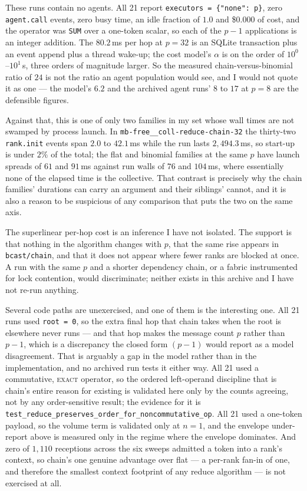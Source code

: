 \documentclass[11pt]{article}
\begin{document}
These runs contain no agents. All 21 report \texttt{executors = \{"none": p\}}, zero
\texttt{agent.call} events, zero busy time, an idle fraction of $1.0$ and \$0.000 of cost, and
the operator was \texttt{SUM} over a one-token scalar, so each of the $p-1$ applications is an
integer addition. The $80.2$\,ms per hop at $p=32$ is an SQLite transaction plus an event append
plus a thread wake-up; the cost model's $\alpha$ is on the order of $10^0$--$10^1$\,s, three
orders of magnitude larger. So the measured chain-versus-binomial ratio of $24$ is not the ratio
an agent population would see, and I would not quote it as one --- the model's $6.2$ and the
archived agent runs' $8$ to $17$ at $p=8$ are the defensible figures.

Against that, this is one of only two families in my set whose wall times are not swamped by
process launch. In \texttt{mb-free\_\_coll-reduce-chain-32} the thirty-two \texttt{rank.init}
events span $2.0$ to $42.1$\,ms while the run lasts $2{,}494.3$\,ms, so start-up is under $2\%$
of the total; the flat and binomial families at the same $p$ have launch spreads of $61$ and
$91$\,ms against run walls of $76$ and $104$\,ms, where essentially none of the elapsed time is
the collective. That contrast is precisely why the chain families' durations can carry an
argument and their siblings' cannot, and it is also a reason to be suspicious of any comparison
that puts the two on the same axis.

The superlinear per-hop cost is an inference I have not isolated. The support is that nothing in
the algorithm changes with $p$, that the same rise appears in \texttt{bcast/chain}, and that it
does not appear where fewer ranks are blocked at once. A run with the same $p$ and a shorter
dependency chain, or a fabric instrumented for lock contention, would discriminate; neither
exists in this archive and I have not re-run anything.

Several code paths are unexercised, and one of them is the interesting one. All 21 runs used
\texttt{root = 0}, so the extra final hop that chain takes when the root is elsewhere never
runs --- and that hop makes the message count $p$ rather than $p-1$, which is a discrepancy the
closed form $(p-1)$ would report as a model disagreement. That is arguably a gap in the model
rather than in the implementation, and no archived run tests it either way. All 21 used a
commutative, \textsc{exact} operator, so the ordered left-operand discipline that is chain's
entire reason for existing is validated here only by the counts agreeing, not by any
order-sensitive result; the evidence for it is
\texttt{test\_reduce\_preserves\_order\_for\_noncommutative\_op}. All 21 used a one-token
payload, so the volume term is validated only at $n=1$, and the envelope under-report above is
measured only in the regime where the envelope dominates. And zero of $1{,}110$ receptions
across the six sweeps admitted a token into a rank's context, so chain's one genuine advantage
over flat --- a per-rank fan-in of one, and therefore the smallest context footprint of any
reduce algorithm --- is not exercised at all.
\end{document}
